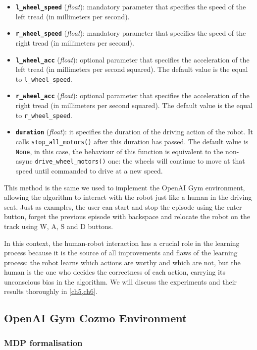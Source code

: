 \begin{itemize}
	\item \textbf{\texttt{l\_wheel\_speed}} (\textit{float}): mandatory parameter that specifies the speed of the left tread (in millimeters per second).
	\item \textbf{\texttt{r\_wheel\_speed}} (\textit{float}): mandatory parameter that specifies the speed of the right tread (in millimeters per second).
	\item \textbf{\texttt{l\_wheel\_acc}} (\textit{float}): optional parameter that specifies the acceleration of the left tread (in millimeters per second squared). The default value is the equal to \texttt{l\_wheel\_speed}.
	\item \textbf{\texttt{r\_wheel\_acc}} (\textit{float}): optional parameter that specifies the acceleration of the right tread (in millimeters per second squared).  The default value is the equal to \texttt{r\_wheel\_speed}.
	\item \textbf{\texttt{duration}} (\textit{float}): it specifies the duration of the driving action of the robot. It calls \texttt{stop\_all\_motors()} after this duration has passed. The default value is \texttt{None}, in this case, the behaviour of this function is equivalent to the non-async \texttt{drive\_wheel\_motors()} one: the wheels will continue to move at that speed until commanded to drive at a new speed.
\end{itemize}

This method is the same we used to implement the OpenAI Gym environment, allowing the algorithm to interact with the robot just like a human in the driving seat. Just as examples, the user can start and stop the episode using the enter button, forget the previous episode with backspace and relocate the robot on the track using W, A, S and D buttons.

In this context, the human-robot interaction has a crucial role in the learning process because it is the source of all improvements and flaws of the learning process: the robot learns which actions are worthy and which are not, but the human is the one who decides the correctness of each action, carrying its unconscious bias in the algorithm. We will discuss the experiments and their results thoroughly in \vref{ch5,ch6}.

\subsection{OpenAI Gym Cozmo Environment}
\subsubsection{MDP formalisation}

